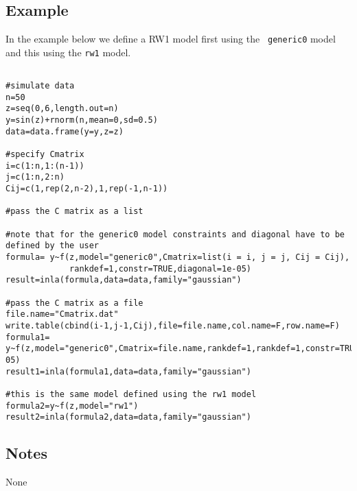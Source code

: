 \documentclass[a4paper,11pt]{article}
\begin{document}
\subsection*{Example}
In the example below we define a RW1 model first using the {\tt
    generic0} model and this using the {\tt rw1} model.
\begin{verbatim}

#simulate data
n=50
z=seq(0,6,length.out=n)
y=sin(z)+rnorm(n,mean=0,sd=0.5)
data=data.frame(y=y,z=z)

#specify Cmatrix
i=c(1:n,1:(n-1))
j=c(1:n,2:n)
Cij=c(1,rep(2,n-2),1,rep(-1,n-1))

#pass the C matrix as a list

#note that for the generic0 model constraints and diagonal have to be defined by the user
formula= y~f(z,model="generic0",Cmatrix=list(i = i, j = j, Cij = Cij),
             rankdef=1,constr=TRUE,diagonal=1e-05)
result=inla(formula,data=data,family="gaussian")

#pass the C matrix as a file
file.name="Cmatrix.dat"
write.table(cbind(i-1,j-1,Cij),file=file.name,col.name=F,row.name=F)
formula1= y~f(z,model="generic0",Cmatrix=file.name,rankdef=1,rankdef=1,constr=TRUE,diagonal=1e-05)
result1=inla(formula1,data=data,family="gaussian")

#this is the same model defined using the rw1 model
formula2=y~f(z,model="rw1")
result2=inla(formula2,data=data,family="gaussian")

\end{verbatim}

\subsection*{Notes}
None
\end{document}
